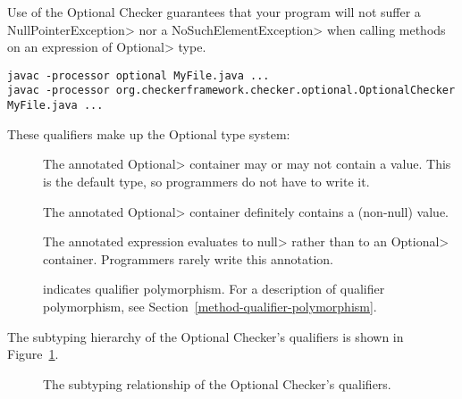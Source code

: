 Use of the Optional Checker guarantees that your program will not suffer a
\<NullPointerException> nor a \<NoSuchElementException> when calling
methods on an expression of \<Optional> type.



\begin{Verbatim}
javac -processor optional MyFile.java ...
javac -processor org.checkerframework.checker.optional.OptionalChecker MyFile.java ...
\end{Verbatim}



These qualifiers make up the Optional type system:

\begin{description}

\item[]
  The annotated \<Optional> container may or may not contain a value.
  This is the default type, so programmers do not have to write it.

\item[]
  The annotated \<Optional> container definitely contains a (non-null) value.

\item[]
  The annotated expression evaluates to \<null> rather than to an \<Optional> container.
  Programmers rarely write this annotation.

\item[]
  indicates qualifier polymorphism.
  For a description of qualifier polymorphism, see
  Section~\ref{method-qualifier-polymorphism}.

\end{description}

The subtyping hierarchy of the Optional Checker's qualifiers is shown in
Figure~\ref{fig-optional-hierarchy}.

\begin{figure}
\caption{The subtyping relationship of the Optional Checker's qualifiers.}
\label{fig-optional-hierarchy}
\end{figure}



